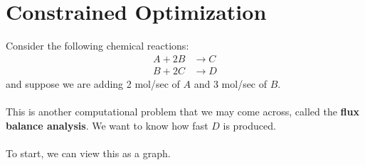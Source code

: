 \documentclass[10pt]{article}
\begin{document}
\section*{Constrained Optimization}
Consider the following chemical reactions:
\begin{align*}
    A + 2B &\rightarrow C\\
    B + 2C &\rightarrow D
\end{align*}
and suppose we are adding 2 mol/sec of $A$ and 3 mol/sec of $B$.\\\\
This is another computational problem that we may come across, called the \textbf{flux balance analysis}.  We want to know how fast $D$ is produced.\\\\
To start, we can view this as a graph.
\end{document}

